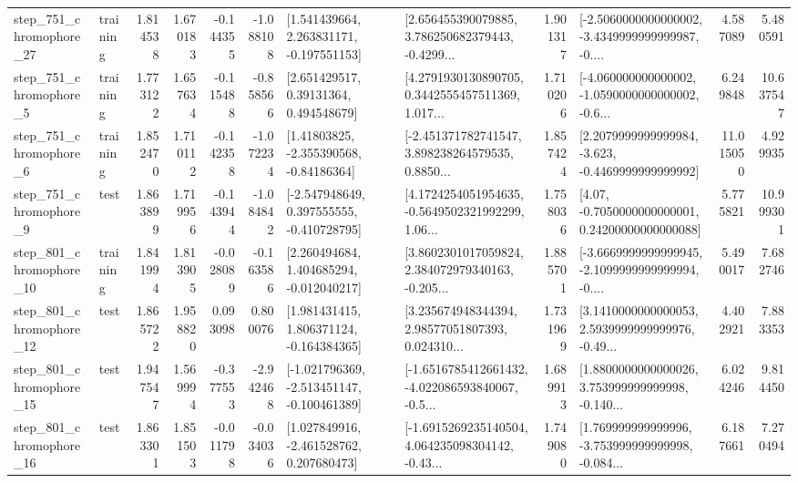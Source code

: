 \begin{tabular}{llrrrrllrlrr}
  step\_751\_chromophore\_27 &  training &      1.814538 &    1.670183 &     -0.144355 & -1.088108 &    [1.541439664, 2.263831171, -0.197551153] &  [2.656455390079885, 3.786250682379443, -0.4299... &       1.901317 &  [-2.5060000000000002, -3.4349999999999987, -0.... &            4.587089 &          5.480591 \\
   step\_751\_chromophore\_5 &  training &      1.773122 &    1.657634 &     -0.115488 & -0.858566 &      [2.651429517, 0.39131364, 0.494548679] &  [4.2791930130890705, 0.3442555457511369, 1.017... &       1.710206 &  [-4.060000000000002, -1.0590000000000002, -0.6... &            6.249848 &         10.637547 \\
   step\_751\_chromophore\_6 &  training &      1.852470 &    1.710112 &     -0.142358 & -1.072234 &     [1.41803825, -2.355390568, -0.84186364] &  [-2.451371782741547, 3.898238264579535, 0.8850... &       1.857424 &  [2.2079999999999984, -3.623, -0.4469999999999992] &           11.015050 &          4.929935 \\
   step\_751\_chromophore\_9 &      test &      1.863899 &    1.719956 &     -0.143944 & -1.084842 &   [-2.547948649, 0.397555555, -0.410728795] &  [4.1724254051954635, -0.5649502321992299, 1.06... &       1.758036 &   [4.07, -0.7050000000000001, 0.24200000000000088] &            5.775821 &         10.999301 \\
  step\_801\_chromophore\_10 &  training &      1.841994 &    1.813905 &     -0.028089 & -0.163586 &    [2.260494684, 1.404685294, -0.012040217] &  [3.8602301017059824, 2.384072979340163, -0.205... &       1.885701 &  [-3.6669999999999945, -2.1099999999999994, -0.... &            5.490017 &          7.682746 \\
  step\_801\_chromophore\_12 &      test &      1.865722 &    1.958820 &      0.093098 &  0.800076 &    [1.981431415, 1.806371124, -0.164384365] &  [3.235674948344394, 2.98577051807393, 0.024310... &       1.731969 &  [3.1410000000000053, 2.5939999999999976, -0.49... &            4.402921 &          7.883353 \\
  step\_801\_chromophore\_15 &      test &      1.947547 &    1.569994 &     -0.377553 & -2.942468 &  [-1.021796369, -2.513451147, -0.100461389] &  [-1.6516785412661432, -4.022086593840067, -0.5... &       1.689913 &  [1.8800000000000026, 3.753999999999998, -0.140... &            6.024246 &          9.814450 \\
  step\_801\_chromophore\_16 &      test &      1.863301 &    1.851503 &     -0.011798 & -0.034036 &    [1.027849916, -2.461528762, 0.207680473] &  [-1.6915269235140504, 4.064235098304142, -0.43... &       1.749080 &  [1.769999999999996, -3.753999999999998, -0.084... &            6.187661 &          7.270494 \\

\end{tabular}
